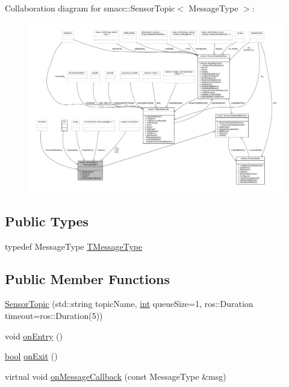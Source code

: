 Collaboration diagram for smacc\+:\+:Sensor\+Topic$<$ Message\+Type $>$\+:
\nopagebreak
\begin{figure}[H]
\begin{center}
\leavevmode
\includegraphics[width=350pt]{classsmacc_1_1SensorTopic__coll__graph}
\end{center}
\end{figure}
\subsection*{Public Types}
\begin{DoxyCompactItemize}
\item 
typedef Message\+Type \hyperlink{classsmacc_1_1SensorTopic_a5ba13cdfe30513184afe37aeaa5bbe88}{T\+Message\+Type}
\end{DoxyCompactItemize}
\subsection*{Public Member Functions}
\begin{DoxyCompactItemize}
\item 
\hyperlink{classsmacc_1_1SensorTopic_a4c252c6221c8745cb226afa1fb690ac0}{Sensor\+Topic} (std\+::string topic\+Name, \hyperlink{classint}{int} queue\+Size=1, ros\+::\+Duration timeout=ros\+::\+Duration(5))
\item 
void \hyperlink{classsmacc_1_1SensorTopic_a27fe3515e3981a5a393dea193902cbd0}{on\+Entry} ()
\item 
\hyperlink{classbool}{bool} \hyperlink{classsmacc_1_1SensorTopic_a563d6288b66605ca99320eab5de9cfba}{on\+Exit} ()
\item 
virtual void \hyperlink{classsmacc_1_1SensorTopic_a1160ef981ab390d75d862a6067615e41}{on\+Message\+Callback} (const Message\+Type \&msg)
\end{DoxyCompactItemize}

